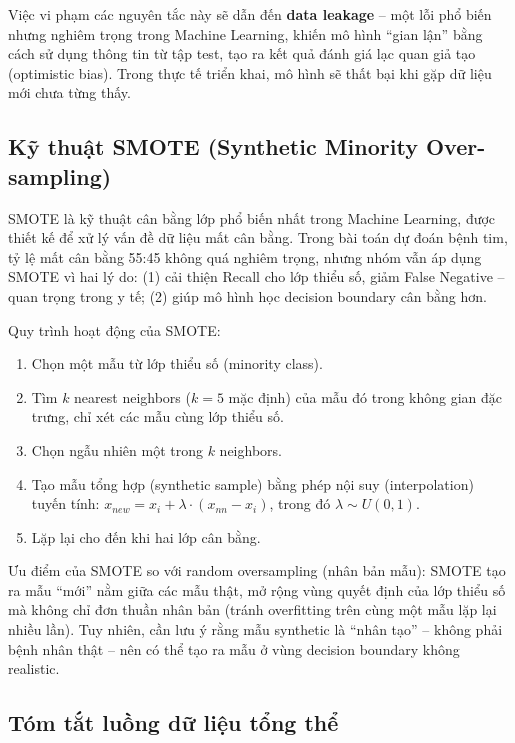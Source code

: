 Việc vi phạm các nguyên tắc này sẽ dẫn đến \textbf{data leakage} -- một lỗi phổ biến nhưng nghiêm trọng trong Machine Learning, khiến mô hình ``gian lận'' bằng cách sử dụng thông tin từ tập test, tạo ra kết quả đánh giá lạc quan giả tạo (optimistic bias). Trong thực tế triển khai, mô hình sẽ thất bại khi gặp dữ liệu mới chưa từng thấy.

\subsection{Kỹ thuật SMOTE (Synthetic Minority Over-sampling)}

SMOTE \cite{chawla2002smote} là kỹ thuật cân bằng lớp phổ biến nhất trong Machine Learning, được thiết kế để xử lý vấn đề dữ liệu mất cân bằng. Trong bài toán dự đoán bệnh tim, tỷ lệ mất cân bằng 55:45 không quá nghiêm trọng, nhưng nhóm vẫn áp dụng SMOTE vì hai lý do: (1) cải thiện Recall cho lớp thiểu số, giảm False Negative -- quan trọng trong y tế; (2) giúp mô hình học decision boundary cân bằng hơn.

Quy trình hoạt động của SMOTE:
\begin{enumerate}
    \item Chọn một mẫu từ lớp thiểu số (minority class).
    \item Tìm $k$ nearest neighbors ($k = 5$ mặc định) của mẫu đó trong không gian đặc trưng, chỉ xét các mẫu cùng lớp thiểu số.
    \item Chọn ngẫu nhiên một trong $k$ neighbors.
    \item Tạo mẫu tổng hợp (synthetic sample) bằng phép nội suy (interpolation) tuyến tính: $x_{new} = x_{i} + \lambda \cdot (x_{nn} - x_{i})$, trong đó $\lambda \sim U(0,1)$.
    \item Lặp lại cho đến khi hai lớp cân bằng.
\end{enumerate}

Ưu điểm của SMOTE so với random oversampling (nhân bản mẫu): SMOTE tạo ra mẫu ``mới'' nằm giữa các mẫu thật, mở rộng vùng quyết định của lớp thiểu số mà không chỉ đơn thuần nhân bản (tránh overfitting trên cùng một mẫu lặp lại nhiều lần). Tuy nhiên, cần lưu ý rằng mẫu synthetic là ``nhân tạo'' -- không phải bệnh nhân thật -- nên có thể tạo ra mẫu ở vùng decision boundary không realistic.

\subsection{Tóm tắt luồng dữ liệu tổng thể}

